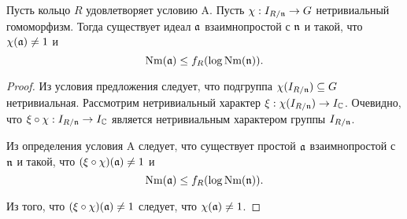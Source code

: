 \documentclass[_00_dissertation.tex]{subfiles}
\begin{document}
\begin{proposition}\label{proposition:condition_A_with_any_homomorphism}
    Пусть кольцо $R$ удовлетворяет условию A.
    Пусть $\chi: I_{R/\mathfrak{n}} \to G$ нетривиальный гомоморфизм.
    Тогда существует идеал $\mathfrak{a}$ взаимнопростой с $\mathfrak{n}$ и такой, что $\chi(\mathfrak{a}) \neq 1$ и
    \begin{equation*}
        \textrm{Nm}(\mathfrak{a}) \le f_R(\log{\textrm{Nm}(\mathfrak{n})}).
    \end{equation*}
\end{proposition}
\begin{proof}
    Из условия предложения следует, что подгруппа $\chi(I_{R/\mathfrak{n}}) \subseteq G$ нетривиальная.
    Рассмотрим нетривиальный характер $\xi: \chi(I_{R/\mathfrak{n}}) \to I_{\mathbb{C}}$.
    Очевидно, что $\xi \circ \chi: I_{R/\mathfrak{n}} \to I_{\mathbb{C}}$ является нетривиальным характером группы $I_{R/\mathfrak{n}}$.
    
    Из определения условия A следует, что существует простой $\mathfrak{a}$ взаимнопростой с $\mathfrak{n}$ и такой, что $(\xi \circ \chi)(\mathfrak{a}) \neq 1$ и
    \begin{equation*}
        \textrm{Nm}(\mathfrak{a}) \le f_R(\log{\textrm{Nm}(\mathfrak{n})}).
    \end{equation*}
    
    Из того, что $(\xi \circ \chi)(\mathfrak{a}) \neq 1$ следует, что $\chi(\mathfrak{a}) \neq 1$.
\end{proof}
\end{document}
